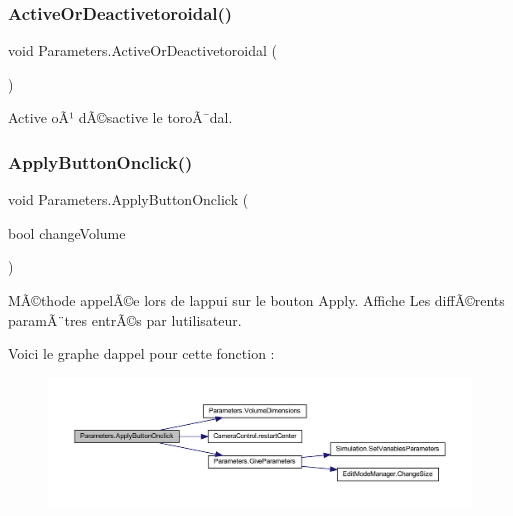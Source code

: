 \subsubsection{\texorpdfstring{Active\+Or\+Deactivetoroidal()}{ActiveOrDeactivetoroidal()}}
{\footnotesize\ttfamily void Parameters.\+Active\+Or\+Deactivetoroidal (\begin{DoxyParamCaption}{ }\end{DoxyParamCaption})\hspace{0.3cm}{\ttfamily [inline]}}



Active oÃ¹ dÃ©sactive le toroÃ¯dal. 

\mbox{\label{class_parameters_a8702daf046aa4d1c44a284c78f6ff058}} 
\subsubsection{\texorpdfstring{Apply\+Button\+Onclick()}{ApplyButtonOnclick()}}
{\footnotesize\ttfamily void Parameters.\+Apply\+Button\+Onclick (\begin{DoxyParamCaption}\item[{bool}]{change\+Volume }\end{DoxyParamCaption})\hspace{0.3cm}{\ttfamily [inline]}}



MÃ©thode appelÃ©e lors de l\textquotesingle{}appui sur le bouton Apply. Affiche Les diffÃ©rents paramÃ¨tres entrÃ©s par l\textquotesingle{}utilisateur. 

Voici le graphe d\textquotesingle{}appel pour cette fonction \+:\nopagebreak
\begin{figure}[H]
\begin{center}
\leavevmode
\includegraphics[width=350pt]{class_parameters_a8702daf046aa4d1c44a284c78f6ff058_cgraph}
\end{center}
\end{figure}
\mbox{\label{class_parameters_a8438e2686a572fc6d1cc2947489da01d}} 
